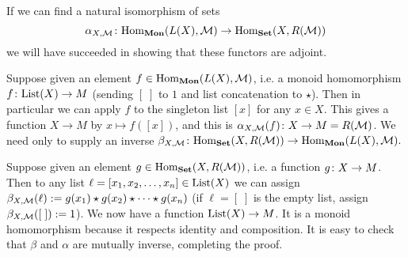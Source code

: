 \documentclass[CT4S-EN-RU]{subfiles}
\begin{document}
\begin{propositionRUS}\label{prop:free forgetful monoid}
\end{propositionRUS}

\begin{proofENG}
If we can find a natural isomorphism of sets 
$$\alpha_{X,\mathcal{M}}\colon\textnormal{Hom}_{\bf Mon}(L(X),\mathcal{M})\rightarrow\textnormal{Hom}_{\bf Set}(X,R(\mathcal{M}))$$
we will have succeeded in showing that these functors are adjoint.

Suppose given an element $f\in\textnormal{Hom}_{\bf Mon}(L(X),\mathcal{M})$, i.e. a monoid homomorphism $f\colon\textnormal{List}(X)\rightarrow M$ (sending $[\;]$ to $1$ and list concatenation to $\star$). Then in particular we can apply $f$ to the singleton list $[x]$ for any $x\in X$. This gives a function $X\to M$ by $x\mapsto f([x])$, and this is $\alpha_{X,\mathcal{M}}(f)\colon X\rightarrow M=R(\mathcal{M})$. We need only to supply an inverse $\beta_{X,\mathcal{M}}\colon\textnormal{Hom}_{\bf Set}(X,R(\mathcal{M}))\rightarrow\textnormal{Hom}_{\bf Mon}(L(X),\mathcal{M}).$

Suppose given an element $g\in\textnormal{Hom}_{\bf Set}(X,R(\mathcal{M}))$, i.e. a function $g\colon X\rightarrow M$. Then to any list $\ell=[x_1,x_2,\ldots,x_n]\in\textnormal{List}(X)$ we can assign $\beta_{X,\mathcal{M}}(\ell):=g(x_1)\star g(x_2)\star\cdots\star g(x_n)$ (if $\ell=[\;]$ is the empty list, assign $\beta_{X,\mathcal{M}}([\;]):=1$). We now have a function $\textnormal{List}(X)\rightarrow M$. It is a monoid homomorphism because it respects identity and composition. It is easy to check that $\beta$ and $\alpha$ are mutually inverse, completing the proof.
\end{proofENG}

\begin{proofRUS}
\end{proofRUS}
\end{document}
